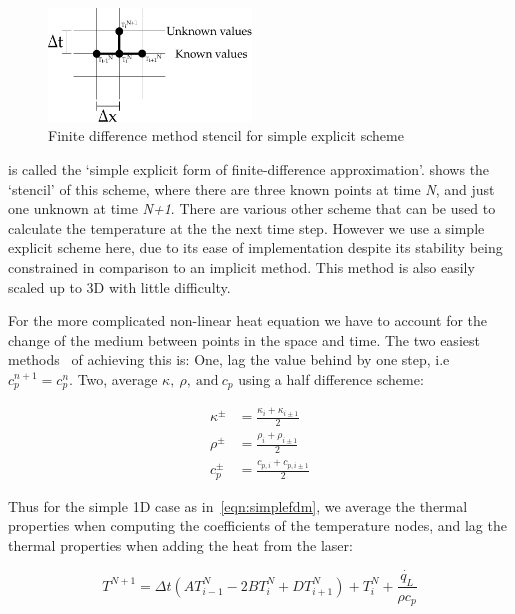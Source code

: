 \begin{figure}
  \begin{center}
    \includegraphics[width=0.48\textwidth]{./ablation/images/fdm-stencil.pdf}
  \end{center}
  \caption{Finite difference method stencil for simple explicit scheme}\label{fig:fdmstencil}
\end{figure}

 is called the `simple explicit form of finite-difference approximation'\cite{ozisik1994finite}.  shows the `stencil' of this scheme, where there are three known points at time \textit{N}, and just one unknown at time \textit{N+1}. There are various other scheme that can be used to calculate the temperature at the the next time step. However we use a simple explicit scheme here, due to its ease of implementation despite its stability being constrained in comparison to an implicit method. This method is also easily scaled up to 3D with little difficulty.

\medskip

For the more complicated non-linear heat equation we have to account for the change of the medium between points in the space and time. The two easiest methods~\cite{ozisik1994finite} of achieving this is: One, lag the value behind by one step, i.e $c_{p}^{n+1}=c_{p}^{n}$. Two, average $\kappa,\ \rho,\ \text{and}\ c_p$ using a half difference scheme:

\begin{align}
\kappa^{\pm}&=\frac{\kappa_i+\kappa_{i\pm 1}}{2}\\
\rho^{\pm}&=\frac{\rho_i+\rho_{i\pm 1}}{2}\\
c_p^{\pm}&=\frac{c_{p,i}+c_{p,i\pm 1}}{2}
\end{align}

Thus for the simple 1D case as in~\cref{eqn:simplefdm}, we average the thermal properties when computing the coefficients of the temperature nodes, and lag the thermal properties when adding the heat from the laser:

\begin{equation}
T^{N+1}=\Delta t (AT^N_{i-1}-2BT^N_{i}+DT^N_{i+1})+ T_i^N + \frac{\dot{q_L}}{\rho c_p}\label{eqn:heatnonlin1d}
\end{equation}

